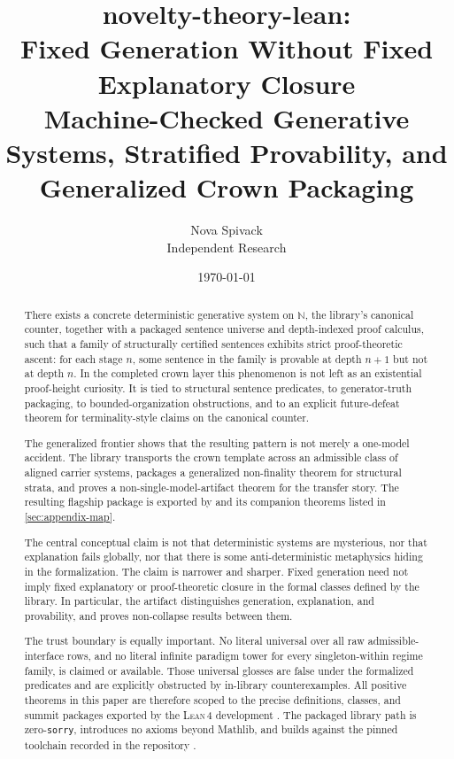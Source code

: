 \documentclass[11pt,a4paper]{article}
\title{\textbf{novelty-theory-lean}:\\
  Fixed Generation Without Fixed Explanatory Closure\\
  {\large Machine-Checked Generative Systems, Stratified Provability, and Generalized Crown Packaging}}
\author{Nova Spivack\\
  \small Independent Research}
\date{\today}
\theoremstyle{definition}
\newcommand{\lean}{\textsc{Lean}\,4}
\begin{document}
\maketitle

\begin{abstract}
There exists a concrete deterministic generative system on $\mathbb{N}$, the library's canonical counter, together with a packaged sentence universe and depth-indexed proof calculus, such that a family of structurally certified sentences exhibits strict proof-theoretic ascent: for each stage $n$, some sentence in the family is provable at depth $n+1$ but not at depth $n$. In the completed crown layer this phenomenon is not left as an existential proof-height curiosity. It is tied to structural sentence predicates, to generator-truth packaging, to bounded-organization obstructions, and to an explicit future-defeat theorem for terminality-style claims on the canonical counter.

The generalized frontier shows that the resulting pattern is not merely a one-model accident. The library transports the crown template across an admissible class of aligned carrier systems, packages a generalized non-finality theorem for structural strata, and proves a non-single-model-artifact theorem for the transfer story. The resulting flagship package is exported by  and its companion theorems listed in \cref{sec:appendix-map}.

The central conceptual claim is not that deterministic systems are mysterious, nor that explanation fails globally, nor that there is some anti-deterministic metaphysics hiding in the formalization. The claim is narrower and sharper. Fixed generation need not imply fixed explanatory or proof-theoretic closure in the formal classes defined by the library. In particular, the artifact distinguishes generation, explanation, and provability, and proves non-collapse results between them.

The trust boundary is equally important. No literal universal over all raw admissible-interface rows, and no literal infinite paradigm tower for every singleton-within regime family, is claimed or available. Those universal glosses are false under the formalized predicates and are explicitly obstructed by in-library counterexamples. All positive theorems in this paper are therefore scoped to the precise definitions, classes, and summit packages exported by the \lean{} development \cite{noveltyTheoryLean2026}. The packaged library path is zero-\texttt{sorry}, introduces no axioms beyond Mathlib, and builds against the pinned toolchain recorded in the repository \cite{noveltyTheoryLean2026,mathlib4,deMoura2021}.
\end{abstract}
\end{document}

